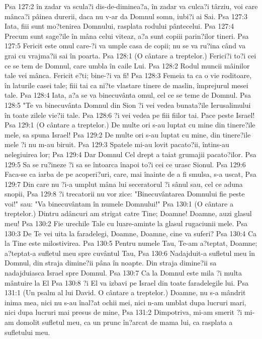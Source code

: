Psa 127:2  în zadar va scula?i dis-de-diminea?a, în zadar va culca?i târziu, voi care mânca?i pâinea durerii, daca nu v-ar da Domnul somn, iubi?i ai Sai.
Psa 127:3  Iata, fiii sunt mo?tenirea Domnului, rasplata rodului pântecelui.
Psa 127:4  Precum sunt sage?ile în mâna celui viteaz, a?a sunt copiii parin?ilor tineri.
Psa 127:5  Fericit este omul care-?i va umple casa de copii; nu se va ru?ina când va grai cu vrajma?ii sai în poarta.
Psa 128:1  (O cântare a treptelor.) Ferici?i to?i cei ce se tem de Domnul, care umbla în caile Lui.
Psa 128:2  Rodul muncii mâinilor tale vei mânca. Fericit e?ti; bine-?i va fi!
Psa 128:3  Femeia ta ca o vie roditoare, în laturile casei tale; fiii tai ca ni?te vlastare tinere de maslin, împrejurul mesei tale.
Psa 128:4  Iata, a?a se va binecuvânta omul, cel ce se teme de Domnul.
Psa 128:5  "Te va binecuvânta Domnul din Sion ?i vei vedea bunata?ile Ierusalimului în toate zilele vie?ii tale.
Psa 128:6  ?i vei vedea pe fiii fiilor tai. Pace peste Israel!
Psa 129:1  (O cântare a treptelor.) De multe ori s-au luptat cu mine din tinere?ile mele, sa spuna Israel!
Psa 129:2  De multe ori s-au luptat cu mine, din tinere?ile mele ?i nu m-au biruit.
Psa 129:3  Spatele mi-au lovit pacato?ii, întins-au nelegiuirea lor;
Psa 129:4  Dar Domnul Cel drept a taiat grumajii pacato?ilor.
Psa 129:5  Sa se ru?ineze ?i sa se întoarca înapoi to?i cei ce urasc Sionul.
Psa 129:6  Faca-se ca iarba de pe acoperi?uri, care, mai înainte de a fi smulsa, s-a uscat,
Psa 129:7  Din care nu ?i-a umplut mâna lui seceratorul ?i sânul sau, cel ce aduna snopii,
Psa 129:8  ?i trecatorii nu vor zice: "Binecuvântarea Domnului fie peste voi!" sau: "Va binecuvântam în numele Domnului!"
Psa 130:1  (O cântare a treptelor.) Dintru adâncuri am strigat catre Tine; Doamne! Doamne, auzi glasul meu!
Psa 130:2  Fie urechile Tale cu luare-aminte la glasul rugaciunii mele.
Psa 130:3  De Te vei uita la faradelegi, Doamne, Doamne, cine va suferi?
Psa 130:4  Ca la Tine este milostivirea.
Psa 130:5  Pentru numele Tau, Te-am a?teptat, Doamne; a?teptat-a sufletul meu spre cuvântul Tau,
Psa 130:6  Nadajduit-a sufletul meu în Domnul, din straja dimine?ii pâna în noapte. Din straja dimine?ii sa nadajduiasca Israel spre Domnul.
Psa 130:7  Ca la Domnul este mila ?i multa mântuire la El
Psa 130:8  ?i El va izbavi pe Israel din toate faradelegile lui.
Psa 131:1  (Un psalm al lui David. O cântare a treptelor.) Doamne, nu s-a mândrit inima mea, nici nu s-au înal?at ochii mei, nici n-am umblat dupa lucruri mari, nici dupa lucruri mai presus de mine,
Psa 131:2  Dimpotriva, mi-am smerit ?i mi-am domolit sufletul meu, ca un prunc în?arcat de mama lui, ca rasplata a sufletului meu.
